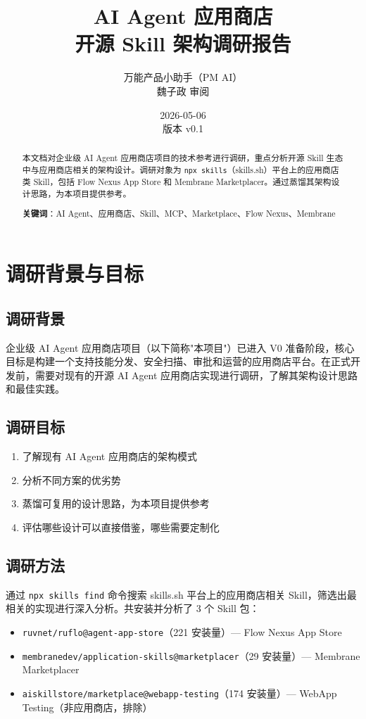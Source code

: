 \documentclass[11pt,a4paper]{article}
\title{\textbf{AI Agent 应用商店}\\[0.5em]开源 Skill 架构调研报告}
\author{万能产品小助手（PM AI）\\魏子政 审阅}
\date{2026-05-06\\版本 v0.1}
\begin{document}
\maketitle

\begin{abstract}
本文档对企业级 AI Agent 应用商店项目的技术参考进行调研，重点分析开源 Skill 生态中与应用商店相关的架构设计。调研对象为 \texttt{npx skills}（skills.sh）平台上的应用商店类 Skill，包括 Flow Nexus App Store 和 Membrane Marketplacer。通过蒸馏其架构设计思路，为本项目提供参考。

\textbf{关键词}：AI Agent、应用商店、Skill、MCP、Marketplace、Flow Nexus、Membrane
\end{abstract}

\tableofcontents
\newpage

\section{调研背景与目标}

\subsection{调研背景}
企业级 AI Agent 应用商店项目（以下简称"本项目"）已进入 V0 准备阶段，核心目标是构建一个支持技能分发、安全扫描、审批和运营的应用商店平台。在正式开发前，需要对现有的开源 AI Agent 应用商店实现进行调研，了解其架构设计思路和最佳实践。

\subsection{调研目标}
\begin{enumerate}
  \item 了解现有 AI Agent 应用商店的架构模式
  \item 分析不同方案的优劣势
  \item 蒸馏可复用的设计思路，为本项目提供参考
  \item 评估哪些设计可以直接借鉴，哪些需要定制化
\end{enumerate}

\subsection{调研方法}
通过 \texttt{npx skills find} 命令搜索 skills.sh 平台上的应用商店相关 Skill，筛选出最相关的实现进行深入分析。共安装并分析了 3 个 Skill 包：
\begin{itemize}
  \item \texttt{ruvnet/ruflo@agent-app-store}（221 安装量）— Flow Nexus App Store
  \item \texttt{membranedev/application-skills@marketplacer}（29 安装量）— Membrane Marketplacer
  \item \texttt{aiskillstore/marketplace@webapp-testing}（174 安装量）— WebApp Testing（非应用商店，排除）
\end{itemize}
\end{document}
